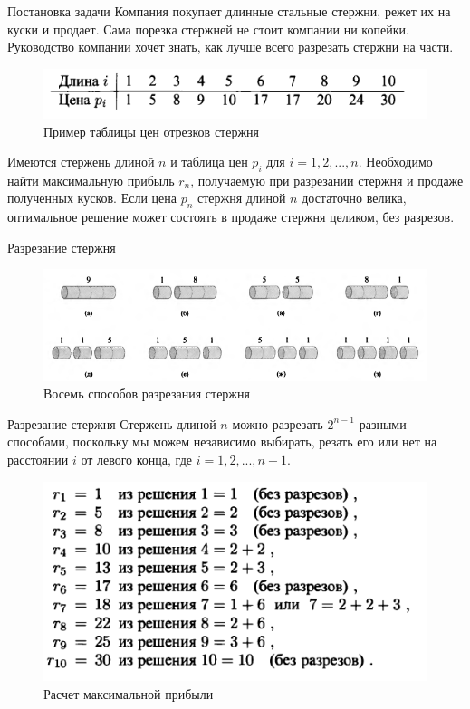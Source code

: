 \documentclass{beamer}
\begin{document}
\begin{frame}[t]
    \begin{block}{Постановка задачи}
        Компания покупает длинные стальные стержни, режет их на куски и продает. Сама порезка стержней не стоит компании ни копейки. Руководство компании хочет знать, как лучше всего разрезать стержни на части.    
    \end{block}
	\begin{figure}[h]
		\centering
		\includegraphics[scale=0.6]{images/lec09-pic01.png}
		\caption{Пример таблицы цен отрезков стержня}
	\end{figure}
	Имеются стержень длиной $n$ и таблица цен $p_i$ для $i = 1, 2, ..., n$. Необходимо найти максимальную прибыль $r_n$, получаемую при разрезании стержня и продаже полученных кусков. Если цена $p_n$ стержня длиной $n$ достаточно велика, оптимальное решение может состоять в продаже стержня целиком, без разрезов.
\end{frame}

\begin{frame}[t]{Разрезание стержня}
	\begin{figure}[h]
		\centering
		\includegraphics[scale=0.6]{images/lec09-pic02.png}
		\caption{Восемь способов разрезания стержня}
	\end{figure}
\end{frame}

\begin{frame}[t]{Разрезание стержня}
    Стержень длиной $n$ можно разрезать $2^{n-1}$ разными способами, поскольку мы можем независимо выбирать, резать его или нет на расстоянии $i$ от левого конца, где $i= 1,2,...,n-1$.
	\begin{figure}[h]
		\centering
		\includegraphics[scale=0.6]{images/lec09-pic03.png}
		\caption{Расчет максимальной прибыли}
	\end{figure}
\end{frame}
\end{document}
